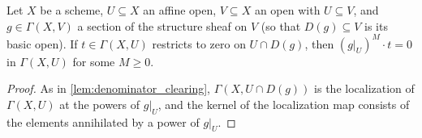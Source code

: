 \begin{lemma}
  \label{lem:section_annihilation}
  \leanok
  Let \(X\) be a scheme, \(U \subseteq X\) an affine open, \(V \subseteq X\) an open with
  \(U \subseteq V\), and \(g \in \Gamma(X, V)\) a section of the structure sheaf on \(V\) (so
  that \(D(g) \subseteq V\) is its basic open). If \(t \in \Gamma(X, U)\) restricts to zero
  on \(U \cap D(g)\), then \((g|_U)^{M} \cdot t = 0\) in \(\Gamma(X, U)\) for some \(M \ge 0\).
\end{lemma}
\begin{proof}
  \leanok
  As in \ref{lem:denominator_clearing}, \(\Gamma(X, U \cap D(g))\) is the localization of
  \(\Gamma(X, U)\) at the powers of \(g|_U\), and the kernel of the localization map consists
  of the elements annihilated by a power of \(g|_U\).
\end{proof}

